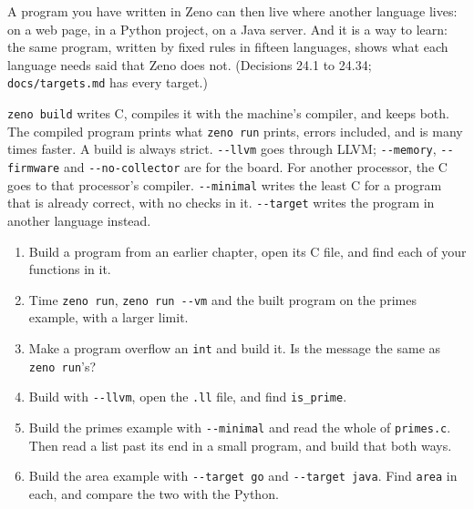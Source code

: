 \begin{why}
A program you have written in Zeno can then live where another language
lives: on a web page, in a Python project, on a Java server. And it is a
way to learn: the same program, written by fixed rules in fifteen
languages, shows what each language needs said that Zeno does not.
(Decisions 24.1 to 24.34; \verb|docs/targets.md| has every target.)
\end{why}

\begin{summary}
\verb|zeno build| writes C, compiles it with the machine's compiler,
and keeps both. The compiled program prints what \verb|zeno run|
prints, errors included, and is many times faster. A build is always
strict. \verb|--llvm| goes through LLVM; \verb|--memory|,
\verb|--firmware| and \verb|--no-collector| are for the board. For
another processor, the C goes to that processor's compiler.
\verb|--minimal| writes the least C for a program that is already
correct, with no checks in it.
\verb|--target| writes the program in another language instead.
\end{summary}

\begin{tryit}
\begin{enumerate}
\item Build a program from an earlier chapter, open its C file, and
  find each of your functions in it.
\item Time \verb|zeno run|, \verb|zeno run --vm| and the built program
  on the primes example, with a larger limit.
\item Make a program overflow an \verb|int| and build it. Is the message
  the same as \verb|zeno run|'s?
\item Build with \verb|--llvm|, open the \verb|.ll| file, and find
  \verb|is_prime|.
\item Build the primes example with \verb|--minimal| and read the
  whole of \verb|primes.c|. Then read a list past its end in a small
  program, and build that both ways.
\item Build the area example with \verb|--target go| and
  \verb|--target java|. Find \verb|area| in each, and compare the two
  with the Python.
\end{enumerate}
\end{tryit}
